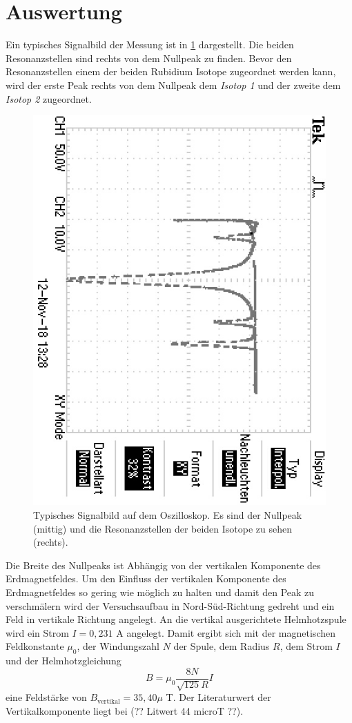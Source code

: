\section{Auswertung}
\label{sec:Auswertung}
Ein typisches Signalbild der Messung ist in \ref{fig:Signal} dargestellt. Die beiden
Resonanzstellen sind rechts von dem Nullpeak zu finden. Bevor den Resonanzstellen einem
der beiden Rubidium Isotope zugeordnet werden kann, wird der erste Peak rechts von dem Nullpeak
dem \textit{Isotop 1} und der zweite dem  \textit{Isotop 2} zugeordnet.
\begin{figure}
  \centering
  \includegraphics[angle=90]{pics/TEK0000.JPG}
  \caption{Typisches Signalbild auf dem Oszilloskop. Es sind der Nullpeak (mittig) und
           die Resonanzstellen der beiden Isotope zu sehen (rechts).}
  \label{fig:Signal}
\end{figure}
Die Breite des Nullpeaks ist Abhängig von der vertikalen Komponente des Erdmagnetfeldes.
Um den Einfluss der vertikalen Komponente des Erdmagnetfeldes so gering wie möglich zu halten
und damit den Peak zu verschmälern wird der Versuchsaufbau in Nord-Süd-Richtung gedreht und ein
Feld in vertikale Richtung angelegt.
An die vertikal ausgerichtete Helmhotzspule wird ein Strom $I= 0,231$ A angelegt. Damit
ergibt sich mit der magnetischen Feldkonstante $\mu_{0}$, der Windungszahl $N$ der Spule,
dem Radius $R$, dem Strom $I$ und der Helmhotzgleichung
\begin{equation}
  B=\mu_{0}\frac{8 N }{\sqrt{125} R}I
\end{equation} eine Feldstärke von $B_{\text{vertikal}}=35,40 \mu$ T.
Der Literaturwert der Vertikalkomponente liegt bei (?? Litwert 44 microT ??).
